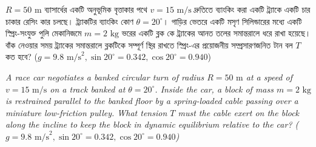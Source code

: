 \documentclass[12pt, a4paper]{article}
\begin{document}
\newpage

\begin{tcolorbox}[questionbox={প্রশ্ন (Question) 21}]
    \noindent
    $R = 50\text{ m}$ ব্যাসার্ধের একটি অনুভূমিক বৃত্তাকার পথে $v = 15\text{ m/s}$ দ্রুতিতে ব্যাংকিং করা একটি ট্র্যাকে একটি চার চাকার রেসিং কার চলছে। ট্র্যাকটির ব্যাংকিং কোণ $\theta = 20^\circ$। গাড়ির ভেতরে একটি মসৃণ সিলিন্ডারের মধ্যে একটি স্প্রিং-সংযুক্ত পুলি মেকানিজমে $m = 2\text{ kg}$ ভরের একটি ব্লক কে ট্র্যাকের আনত তলের সমান্তরালে ধরে রাখা হয়েছে। বাঁক নেওয়ার সময় ট্র্যাকের সমান্তরালে ব্লকটিকে সম্পূর্ণ স্থির রাখতে স্প্রিং-এর প্রয়োজনীয় সম্প্রসারণজনিত টান বল $T$ কত হবে? ($g = 9.8\text{ m/s}^2, \sin 20^\circ = 0.342, \cos 20^\circ = 0.940$)
    
    \vspace{0.8em}
    \begin{english}
    \noindent\textit{\color{darkgray}
    A race car negotiates a banked circular turn of radius $R = 50\text{ m}$ at a speed of $v = 15\text{ m/s}$ on a track banked at $\theta = 20^\circ$. Inside the car, a block of mass $m = 2\text{ kg}$ is restrained parallel to the banked floor by a spring-loaded cable passing over a miniature low-friction pulley. What tension $T$ must the cable exert on the block along the incline to keep the block in dynamic equilibrium relative to the car? ($g = 9.8\text{ m/s}^2, \sin 20^\circ = 0.342, \cos 20^\circ = 0.940$)
    }
    \end{english}
\end{tcolorbox}

\vspace{1em}
\begin{center}
\end{center}
\vspace{1em}
\end{document}
